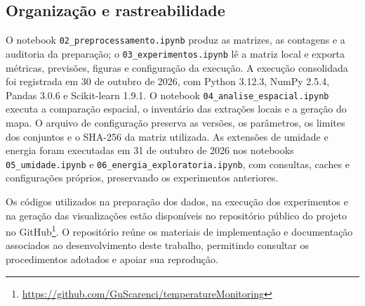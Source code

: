 \subsection{Organização e rastreabilidade}
\label{subsec:reprodutibilidade}

O notebook \texttt{02\_preprocessamento.ipynb} produz as matrizes,
as contagens e a auditoria da preparação; o
\texttt{03\_experimentos.ipynb} lê a matriz local e exporta métricas,
previsões, figuras e configuração da execução. A execução consolidada
foi registrada em 30 de outubro de 2026, com Python 3.12.3,
NumPy 2.5.4, Pandas 3.0.6 e Scikit-learn 1.9.1.
O notebook \texttt{04\_analise\_espacial.ipynb} executa a comparação
espacial, o inventário das extrações locais e a geração do mapa.
O arquivo de configuração preserva as versões, os parâmetros,
os limites dos conjuntos e o SHA-256 da matriz utilizada.
As extensões de umidade e energia foram executadas em 31 de outubro
de 2026 nos notebooks \texttt{05\_umidade.ipynb} e
\texttt{06\_energia\_exploratoria.ipynb}, com consultas, caches
e configurações próprios, preservando os experimentos anteriores.

Os códigos utilizados na preparação dos dados, na execução dos
experimentos e na geração das visualizações estão disponíveis
no repositório público do projeto no GitHub\footnote{
\url{https://github.com/GuScarenci/temperatureMonitoring}}.
O repositório reúne os materiais de implementação e documentação
associados ao desenvolvimento deste trabalho, permitindo consultar
os procedimentos adotados e apoiar sua reprodução.
